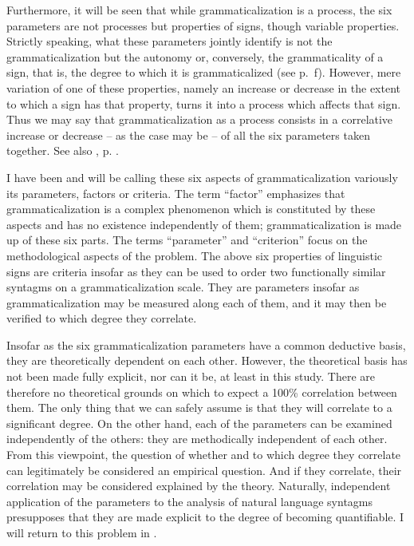 \label{page135c}Furthermore, it will be seen that while grammaticalization is a process, the six parameters are not processes but properties of signs, though variable properties. Strictly speaking, what these parameters jointly identify is not the grammaticalization but the autonomy or, conversely, the grammaticality of a sign, that is, the degree to which it is grammaticalized (see p.~\pageref{page11}f). \chk%
However, mere variation of one of these properties, namely an increase or decrease in the extent to which a sign has that property, turns it into a process which affects that sign. Thus we may say that grammaticalization as a process consists in a correlative increase or decrease -- as the case may be -- of all the six parameters taken together. See also , p. \pageref{T6}.

I have been and will be calling these six aspects of grammaticalization variously its parameters, factors or criteria. The term ``factor'' emphasizes that grammaticalization is a complex phenomenon which is constituted by these aspects and has no existence independently of them; grammaticalization is made up of these six parts. The terms ``parameter'' and ``criterion'' focus on the methodological aspects of the problem. The above six properties of linguistic signs are criteria insofar as they can be used to order two functionally similar syntagms on a grammaticalization scale. They are parameters insofar as grammaticalization may be measured along each of them, and it may then be verified to which degree they correlate.

Insofar as the six grammaticalization parameters have a common deductive basis, they are theoretically dependent on each other. However, the theoretical basis has not been made fully explicit, nor can it be, at least in this study. There are therefore no theoretical grounds on which to expect a 100\% correlation between them. The only thing that we can safely assume is that they will correlate to a significant degree. On the other hand, each of the parameters can be examined independently of the others: they are methodically independent of each other. From this viewpoint, the question of whether and to which degree they correlate can legitimately be considered an empirical question. And if they correlate, their correlation may be considered explained by the theory. Naturally, independent application of the parameters to the analysis of natural language syntagms presupposes that they are made explicit to the degree of becoming quantifiable. I will return to this problem in .

